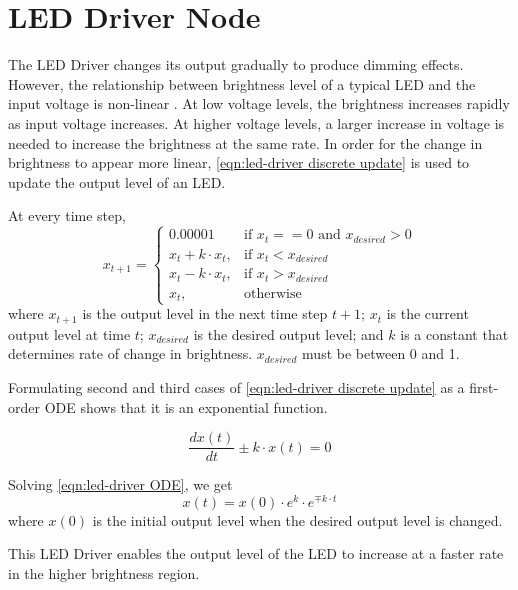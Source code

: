 \section{LED Driver Node}\label{Append:LED Driver}

The LED Driver changes its output gradually to produce dimming effects. However, the relationship between brightness level of a typical LED and the input voltage is non-linear \cite{CreeSpecs}. At low voltage levels, the brightness increases rapidly as input voltage increases. At higher voltage levels, a larger increase in voltage is needed to increase the brightness at the same rate. In order for the change in brightness to appear more linear, \eqref{eqn:led-driver discrete update} is used to update the output level of an LED. 
 
 At every time step, 
 \begin{equation}\label{eqn:led-driver discrete update}
 x_{t+1} =
 \begin{cases}
 0.00001 & \text{if } x_{t} == 0 \text{ and }  x_{desired} > 0 \\
 x_{t} + k \cdot x_{t}, & \text{if } x_{t} < x_{desired} \\
 x_{t} - k \cdot x_{t}, & \text{if } x_{t} > x_{desired} \\
 x_{t}, & \text{otherwise}
 \end{cases} 
 \end{equation}
 where $x_{t+1}$ is the output level in the next time step $t+1$; $x_t$ is the current output level at time $t$; $x_{desired}$ is the desired output level; and $k$ is a constant that determines rate of change in brightness. $x_{desired}$ must be between 0 and 1. 
 
 Formulating second and third cases of \eqref{eqn:led-driver discrete update} as a first-order ODE shows that it is an exponential function. 
 
 \begin{equation}\label{eqn:led-driver ODE}
 \frac{dx(t)}{dt} \pm k \cdot x(t)  = 0
 \end{equation}
 
 Solving \eqref{eqn:led-driver ODE}, we get 
 \begin{equation}\label{eqn:led-driver ODE_solved}
 x(t) = x(0) \cdot e^k \cdot e^{\mp k \cdot t}
 \end{equation}
 where $x(0)$ is the initial output level when the desired output level is changed.
 
This LED Driver enables the output level of the LED to increase at a faster rate in the higher brightness region. 

